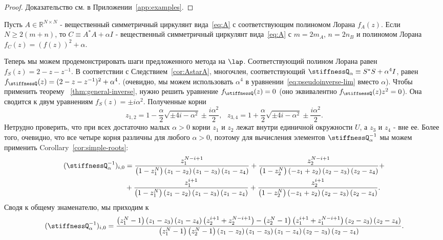 \begin{proof}
	Доказательство см. в Приложении~\ref{app:examples}.
\end{proof}
\begin{corollary}\label{cor:AstarA}
	Пусть $A \in \mathbb{R}^{N \times N}$ - вещественный симметричный циркулянт вида~\eqref{eq:A} с соответствующим полиномом Лорана $f_A(z)$.
	Если $N \ge 2(m+n)$, то $C \equiv A^*A+\alpha I$ - вещественный симметричный циркулянт вида~\eqref{eq:A} с $m = 2m_A$, $n = 2n_B$ и полиномом Лорана $f_C(z) = (f(z))^2 + \alpha$.
\end{corollary}
Теперь мы можем продемонстрировать шаги предложенного метода на $\lap$.
Соответствующий полином Лорана равен $f_S(z) = 2 - z-z^{-1}$.
В соответствии с Следствием~\ref{cor:AstarA}, многочлен, соответствующий $\stiffnessQ_{\alpha} \equiv S^*S + \alpha^4 I$, равен $f_\stiffnessQ(z) = (2-z-z^{-1})^2 + \alpha^4$.
(очевидно, мы можем использовать $\alpha^4$ в уравнении~\eqref{eq:pseudoinverse-lim} вместо $\alpha$).
Чтобы применить теорему ~\ref{thm:general-inverse}, нужно решить уравнение $f_\stiffnessQ(z) = 0$ (оно эквивалентно $f_\stiffnessQ(z)z^2 = 0$).
Она сводится к двум уравнениям $f_S(z) = \pm i\alpha^2$.
Полученные корни
\[
z_{1,2} = 1 - \frac{\alpha}{2}\sqrt{\pm 4i - \alpha^2} \pm \frac{i\alpha^2}{2},~~~z_{3,4} = 1 + \frac{\alpha}{2}\sqrt{\pm 4i -\alpha^2} \pm \frac{i\alpha^2}{2}.
\]
Нетрудно проверить, что при всех достаточно малых $\alpha > 0$ корни $z_1$ и $z_2$ лежат внутри единичной окружности $U$, а $z_3$ и $z_4$ - вне ее.
Более того, очевидно, что все четыре корня различны для любого $\alpha > 0$, поэтому для вычисления элементов $\stiffnessQ_{\alpha}^{-1}$ мы можем применить Corollary~\ref{cor:simple-roots}:
\begin{align*}
(\stiffnessQ_\alpha^{-1})_{i,0} &= 
\frac{z_{1}^{N - i + 1}}{\left(1 - z_{1}^{N}\right) \left(z_{1} - z_{2}\right) \left(z_{1} - z_{3}\right) \left(z_{1} - z_{4}\right)}
+
\frac{z_{2}^{N - i + 1}}{\left(1 - z_{2}^{N}\right) \left(- z_{1} + z_{2}\right) \left(z_{2} - z_{3}\right) \left(z_{2} - z_{4}\right)}
+\\&+
\frac{z_{1}^{i + 1}}{\left(1 - z_{1}^{N}\right) \left(z_{1} - z_{2}\right) \left(z_{1} - z_{3}\right) \left(z_{1} - z_{4}\right)}
+
\frac{z_{2}^{i + 1}}{\left(1 - z_{2}^{N}\right) \left(- z_{1} + z_{2}\right) \left(z_{2} - z_{3}\right) \left(z_{2} - z_{4}\right)}.
\end{align*}
Сводя к общему знаменателю, мы приходим к
\[
(\stiffnessQ_\alpha^{-1})_{i,0}
=
\frac
{\left(z_{1}^{N} - 1\right)\left(z_{1} - z_{3}\right) \left(z_{1} - z_{4}\right)  \left(z_{2}^{i + 1} + z_{2}^{N - i + 1}\right)
	-
	\left(z_{2}^{N} - 1\right)\left(z_{1}^{i + 1} + z_{1}^{N - i + 1}\right) \left(z_{2} - z_{3}\right) \left(z_{2} - z_{4}\right) }
{\left(z_{1}^{N} - 1\right) \left(z_{2}^{N} - 1\right) \left(z_{1} - z_{2}\right) \left(z_{1} - z_{3}\right) \left(z_{1} - z_{4}\right) \left(z_{2} - z_{3}\right) \left(z_{2} - z_{4}\right) }.
\]
